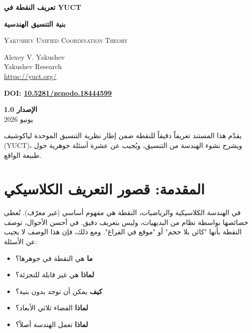 \documentclass[12pt,a4paper]{article}
\begin{document}
	
	\begin{titlepage}
		\begin{center}
			\vspace*{1.5cm}
			\Huge\textbf{تعريف النقطة في YUCT}
			
			\vspace{0.3cm}
			\Large\textbf{بنية التنسيق الهندسية}
			
			\vspace{0.5cm}
			\large
			\textsc{Yakushev Unified Coordination Theory}
			
			\vspace{0.8cm}
			\large
			Alexey V. Yakushev \\
			Yakushev Research \\
			\url{https://yuct.org/}
			
			\vspace{0.5cm}
			\large
			\textbf{DOI: \href{https://doi.org/10.5281/zenodo.18444599}{10.5281/zenodo.18444599}}
			
			\vspace{1.5cm}
			\large
			\textbf{الإصدار 1.0} \\
			يونيو 2026
			
			\vfill
			\normalsize
			يقدّم هذا المستند تعريفاً دقيقاً للنقطة ضمن إطار نظرية التنسيق الموحدة لياكوشيف (YUCT)،
			ويشرح نشوء الهندسة من التنسيق، ويُجيب عن عشرة أسئلة جوهرية حول طبيعة الواقع.
		\end{center}
	\end{titlepage}
	
	\tableofcontents
	\newpage
	
	\section{المقدمة: قصور التعريف الكلاسيكي}
	
	في الهندسة الكلاسيكية والرياضيات، النقطة هي مفهوم أساسي (غير معرّف). تُعطى خصائصها بواسطة نظام من البديهيات، وليس بتعريف دقيق. في أحسن الأحوال، توصف النقطة بأنها "كائن بلا حجم" أو "موقع في الفراغ". ومع ذلك، فإن هذا الوصف لا يجيب عن الأسئلة:
	
	\begin{itemize}
		\item \textbf{ما} هي النقطة في جوهرها؟
		\item \textbf{لماذا} هي غير قابلة للتجزئة؟
		\item \textbf{كيف} يمكن أن توجد بدون بنية؟
		\item \textbf{لماذا} الفضاء ثلاثي الأبعاد؟
		\item \textbf{لماذا} تعمل الهندسة أصلاً؟
	\end{itemize}
	
\end{document}
